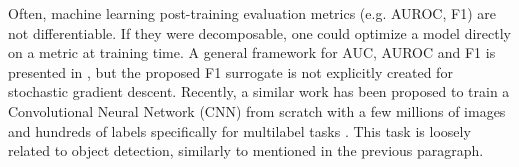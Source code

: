 Often, machine learning post-training evaluation metrics (e.g. AUROC, F1) are
not differentiable. If they were decomposable, one could
optimize a model directly on a metric at training time. A general framework
for AUC, AUROC and F1 is presented in \cite{optimizableLosses}, but the
proposed F1 surrogate is not explicitly created for stochastic gradient
descent. Recently, a similar work has been proposed to train a Convolutional
Neural Network (CNN) from scratch with a few millions of images and hundreds
of labels specifically for multilabel tasks \cite{tencent}. This task is
loosely related to object detection, similarly to \cite{multitaskLabelImages}
mentioned in the previous paragraph.






